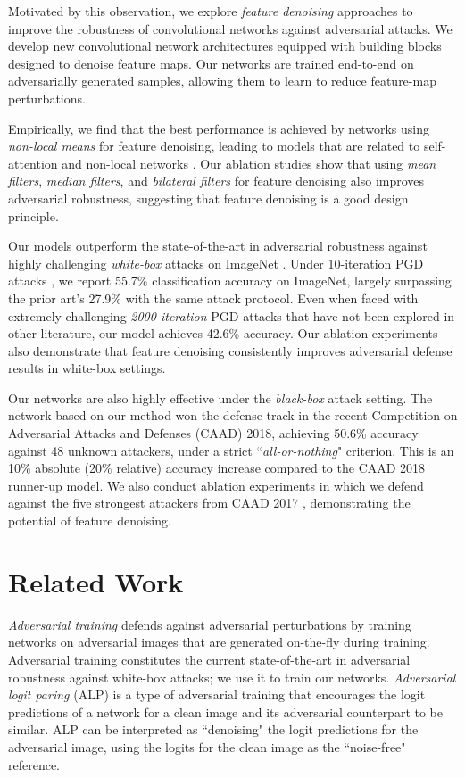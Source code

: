 \documentclass[10pt,twocolumn,letterpaper]{article}
\begin{document}
Motivated by this observation, we explore \emph{feature denoising} approaches to improve the robustness of convolutional networks against adversarial attacks.
We develop new convolutional network architectures equipped with building blocks designed to denoise feature maps. Our networks are trained end-to-end on adversarially generated samples, allowing them to learn to reduce feature-map perturbations. 

Empirically, we find that the best performance is achieved by networks using \emph{non-local means} \cite{Buades2005} for feature denoising, leading to models that are related to self-attention \cite{Vaswani2017} and non-local networks \cite{Wang2018}. Our ablation studies show that using \emph{mean filters}, \emph{median filters}, and \emph{bilateral filters} \cite{Tomasi1998} for feature denoising also improves adversarial robustness, suggesting that feature denoising is a good design principle.

Our models outperform the state-of-the-art in adversarial robustness against highly challenging \emph{white-box} attacks on ImageNet \cite{Russakovsky2015}.
Under 10-iteration PGD attacks \cite{Madry2018}, we report 55.7\% classification accuracy on ImageNet, largely surpassing the prior art's 27.9\% \cite{Kannan2018} with the same attack protocol.
Even when faced with extremely challenging \emph{2000-iteration} PGD attacks that have not been explored in other literature, our model achieves 42.6\% accuracy. Our ablation experiments also demonstrate that feature denoising consistently improves adversarial defense results in white-box settings.

Our networks are also highly effective under the \emph{black-box} attack setting.
The network based on our method won the defense track in the recent Competition on Adversarial Attacks and Defenses (CAAD) 2018, achieving 50.6\% accuracy against 48 unknown attackers, under a strict ``\emph{all-or-nothing}" criterion. This is an 10\% absolute (20\% relative) accuracy increase compared to the CAAD 2018 runner-up model.
We also conduct ablation experiments in which we defend against the five strongest attackers from CAAD 2017 \cite{Kurakin2018}, demonstrating the potential of feature denoising.

\section{Related Work}

\emph{Adversarial training} \cite{Goodfellow2015,Kannan2018,Madry2018} defends against adversarial perturbations by training networks on adversarial images that are generated on-the-fly during training. Adversarial training constitutes the current state-of-the-art in adversarial robustness against white-box attacks; we use it to train our networks. \emph{Adversarial logit paring} (ALP) \cite{Kannan2018} is a type of adversarial training that encourages the logit predictions of a network for a clean image and its adversarial counterpart to be similar. ALP can be interpreted as ``denoising" the logit predictions for the adversarial image, using the logits for the clean image as the ``noise-free" reference.
\end{document}
